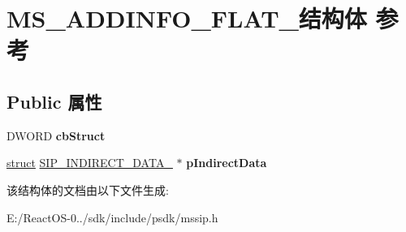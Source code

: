 \hypertarget{struct_m_s___a_d_d_i_n_f_o___f_l_a_t__}{}\section{M\+S\+\_\+\+A\+D\+D\+I\+N\+F\+O\+\_\+\+F\+L\+A\+T\+\_\+结构体 参考}
\label{struct_m_s___a_d_d_i_n_f_o___f_l_a_t__}
\subsection*{Public 属性}
\begin{DoxyCompactItemize}
\item 
\mbox{\label{struct_m_s___a_d_d_i_n_f_o___f_l_a_t___aeb59e21d899b8e2ae295fb466f9739a4}} 
D\+W\+O\+RD {\bfseries cb\+Struct}
\item 
\mbox{\label{struct_m_s___a_d_d_i_n_f_o___f_l_a_t___a8830aeb2e7adf9dc29efd393fdc3ab79}} 
\hyperlink{interfacestruct}{struct} \hyperlink{struct_s_i_p___i_n_d_i_r_e_c_t___d_a_t_a__}{S\+I\+P\+\_\+\+I\+N\+D\+I\+R\+E\+C\+T\+\_\+\+D\+A\+T\+A\+\_\+} $\ast$ {\bfseries p\+Indirect\+Data}
\end{DoxyCompactItemize}


该结构体的文档由以下文件生成\+:\begin{DoxyCompactItemize}
\item 
E\+:/\+React\+O\+S-\/0../sdk/include/psdk/mssip.\+h\end{DoxyCompactItemize}
